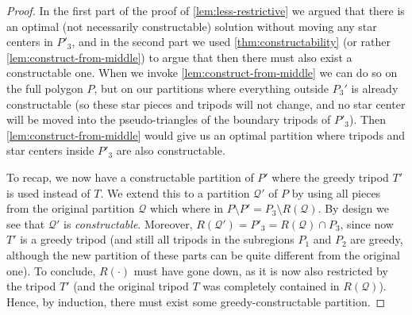 \documentclass{theoretics}
\begin{document}
\begin{proof}
In the first part of the proof of \cref{lem:less-restrictive} we argued that there is an optimal (not necessarily constructable) solution without moving any star centers in $P'_3$, and in the second part we used \cref{thm:constructability} (or rather \cref{lem:construct-from-middle}) to argue that then there must also exist a constructable one. When we invoke \cref{lem:construct-from-middle} we can do so on the full polygon $P$, but on our partitions where everything outside $P_3'$ is already constructable (so these star pieces and tripods will not change, and no star center will be moved into the pseudo-triangles of the boundary tripods of $P'_3$). Then \cref{lem:construct-from-middle} would give us an optimal partition where tripods and star centers inside $P'_3$ are also constructable.

To recap, we now have a constructable partition of $P'$ where the greedy tripod $T'$ is used instead of $T$. We extend this to a partition $\mathcal{Q}'$ of $P$ by using all pieces from the original partition $\mathcal{Q}$ which where in $P\setminus P' = P_3\setminus R(\mathcal{Q})$. By design we see that $\mathcal{Q}'$ is \emph{constructable}. Moreover, $R(\mathcal{Q'}) = P'_3 = R(\mathcal{Q})\cap P_3$, since now $T'$ is a greedy tripod (and still all tripods in the subregions $P_1$ and $P_2$ are greedy, although the new partition of these parts can be quite different from the original one). To conclude, $R(\cdot)$ must have gone down, as it is now also restricted by the tripod $T'$ (and the original tripod $T$ was completely contained in $R(\mathcal{Q})$). Hence, by induction, there must exist some greedy-constructable partition.
\end{proof}
\end{document}
